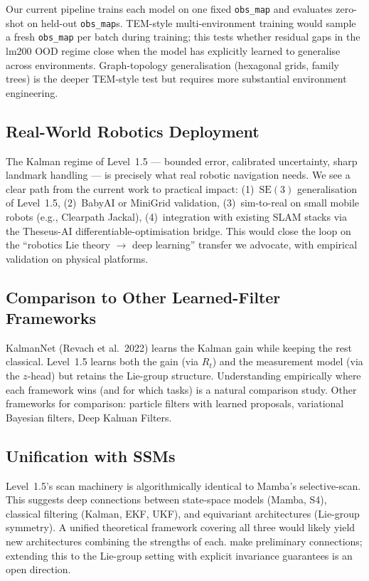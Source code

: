 Our current pipeline trains each model on one fixed \texttt{obs\_map}
and evaluates zero-shot on held-out \texttt{obs\_map}s. TEM-style
multi-environment training would sample a fresh \texttt{obs\_map} per
batch during training; this tests whether residual gaps in the lm200
OOD regime close when the model has explicitly learned to generalise
across environments. Graph-topology generalisation (hexagonal grids,
family trees) is the deeper TEM-style test but requires more
substantial environment engineering.

\subsection{Real-World Robotics Deployment}

The Kalman regime of Level~1.5 --- bounded error, calibrated
uncertainty, sharp landmark handling --- is precisely what real
robotic navigation needs. We see a clear path from the current work to
practical impact: (1)~$\mathrm{SE}(3)$ generalisation of Level~1.5,
(2)~BabyAI or MiniGrid validation, (3)~sim-to-real on small mobile
robots (e.g., Clearpath Jackal), (4)~integration with existing SLAM
stacks via the Theseus-AI differentiable-optimisation bridge. This
would close the loop on the ``robotics Lie theory $\to$ deep learning''
transfer we advocate, with empirical validation on physical platforms.

\subsection{Comparison to Other Learned-Filter Frameworks}

KalmanNet (Revach et al.\ 2022) learns the Kalman gain while keeping the
rest classical. Level~1.5 learns both the gain (via $R_t$) and the
measurement model (via the $z$-head) but retains the Lie-group
structure. Understanding empirically where each framework wins (and
for which tasks) is a natural comparison study. Other frameworks for
comparison: particle filters with learned proposals, variational
Bayesian filters, Deep Kalman Filters.

\subsection{Unification with SSMs}

Level~1.5's scan machinery is algorithmically identical to Mamba's
selective-scan. This suggests deep connections between state-space
models (Mamba, S4), classical filtering (Kalman, EKF, UKF), and
equivariant architectures (Lie-group symmetry). A unified theoretical
framework covering all three would likely yield new architectures
combining the strengths of each. \citet{wang2025mamba-kalman} make
preliminary connections; extending this to the Lie-group setting with
explicit invariance guarantees is an open direction.

